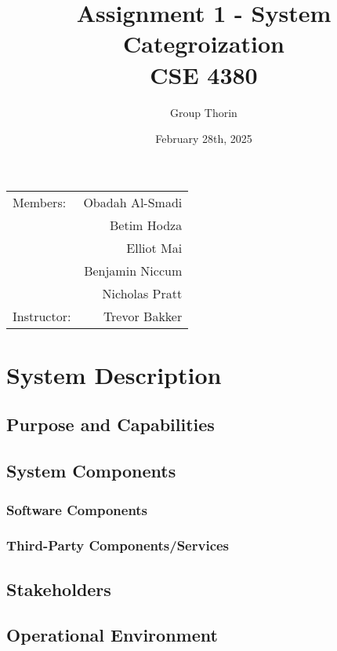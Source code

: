 \documentclass{article}
\title{Assignment 1 - System Categroization \\ CSE 4380}
\author{Group Thorin}
\date{February 28th, 2025}
\begin{document}
\maketitle
\begin{center}
\begin{tabular}{l r}

Members: 	& Obadah Al-Smadi\\
			& Betim Hodza\\
			& Elliot Mai\\
			& Benjamin Niccum\\
        	& Nicholas Pratt\\
Instructor: & Trevor Bakker\end{tabular}
\end{center}

\newpage

\setcounter{tocdepth}{2}
\tableofcontents
\newpage

\listoffigures
\listoftables
\newpage

\section{System Description}

\subsection{Purpose and Capabilities}

\subsection{System Components}

\subsubsection{Software Components}

\subsubsection{Third-Party Components/Services}

\subsection{Stakeholders}

\subsection{Operational Environment}
\end{document}
